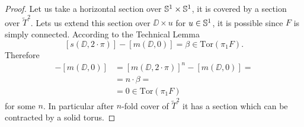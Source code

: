 \documentclass{amsart}
\begin{document}
\begin{proof}
Let us take a horizontal section over ${\Bbb S}^1\times {\Bbb S}^1$, 
it is covered by a section over $\widetilde T^2$. 
Lets us extend this section over $\DD\times u$ for $u\in {\Bbb S}^1$, 
it is possible since $F$ is simply connected.
According to the Technical Lemma 
\[[s(\DD,2{\cdot} \pi)]-[m(\DD,0)]
=
\beta\in \mathrm{Tor}(\pi_1F).\]
Therefore  
\begin{align*}
[m(\DD,2{\cdot} \pi{\cdot} n)]-[m(\DD,0)]
&=
[m(\DD,2{\cdot} \pi)]^n-[m(\DD,0)]=
\\&=
n{\cdot}\beta=
\\
&=0\in \mathrm{Tor}(\pi_1F)
\end{align*}
for some $n$. 
In particular after $n$-fold cover of $\widetilde T^2$ it has a section which can be contracted by a solid torus.
\end{proof}















































\small

%
\end{document}
